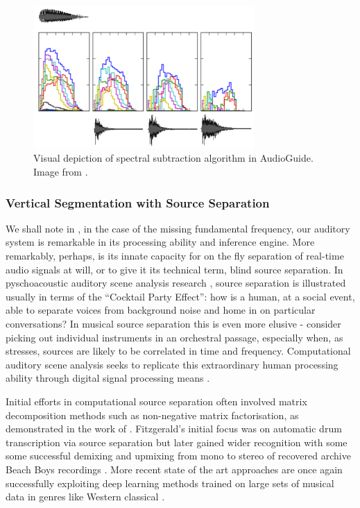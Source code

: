 \begin{figure}
	\begin{center}
		\includegraphics[width=0.75\textwidth]{ch05_pyconcat/figures/spectrum_subtraction}
	\end{center}
	\caption[Spectral Subtraction Algorithm in AudioGuide]{Visual depiction of spectral subtraction algorithm in AudioGuide. Image from \cite{Hackbarth2010}.}
	\label{fig:spectrum_subtraction}
\end{figure} 

\subsubsection{Vertical Segmentation with Source Separation}

We shall note in , in the case of the missing fundamental frequency, our auditory system is remarkable in its processing ability and inference engine. More remarkably,  perhaps, is its innate capacity for on the fly separation of real-time audio signals at will, or to give it its technical term, blind source separation. In pyschoacoustic auditory scene analysis research \citep{Bregman1994}, source separation is illustrated usually in terms of the ``Cocktail Party Effect'': how is a human, at a social event, able to separate voices from background noise and home in on particular conversations? In musical source separation this is even more elusive - consider picking out individual instruments in an orchestral passage, especially when, as \cite{Miron2017a} stresses, sources are likely to be correlated in time and frequency. Computational auditory scene analysis seeks to replicate this extraordinary human processing ability through digital signal processing means \citep{Wang2006}.

Initial efforts in computational source separation often involved matrix decomposition methods such as non-negative matrix factorisation, as demonstrated in the work of 
\cite{Fitz2004}. Fitzgerald's initial focus was on automatic drum transcription via source separation but later gained wider recognition with some some successful demixing and upmixing from mono to stereo of recovered archive Beach Boys recordings \citep{Fitz2004}. More recent state of the art approaches are once again successfully exploiting deep learning methods trained on large sets of musical data in genres like Western classical \citep{Miron2017a, Miron2017}.

